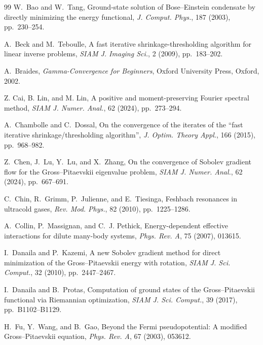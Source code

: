 \documentclass[11pt]{article}
\theoremstyle{plain}
\theoremstyle{definition}
\numberwithin{equation}{section}
\begin{document}
\begin{thebibliography}{99}
W.~Bao and W.~Tang,
\newblock Ground-state solution of Bose--Einstein condensate by
directly minimizing the energy functional,
\newblock \emph{J. Comput. Phys.}, 187 (2003), pp.~230--254.

A.~Beck and M.~Teboulle,
\newblock A fast iterative shrinkage-thresholding algorithm for linear inverse problems,
\newblock \emph{SIAM J. Imaging Sci.}, 2 (2009), pp.~183--202.

A.~Braides,
\newblock \emph{Gamma-Convergence for Beginners},
\newblock Oxford University Press, Oxford, 2002.


Z. Cai, B. Lin, and M. Lin,
\newblock A positive and moment-preserving {Fourier} spectral method,
\newblock \emph{SIAM J. Numer. Anal.}, 62 (2024), pp.~273--294.


A.~Chambolle and C.~Dossal,
\newblock On the convergence of the iterates of the ``fast iterative
shrinkage/thresholding algorithm'',
\newblock \emph{J. Optim. Theory Appl.}, 166 (2015), pp.~968--982.

Z.~Chen, J.~Lu, Y.~Lu, and X.~Zhang,
\newblock On the convergence of Sobolev gradient flow for the
Gross--Pitaevskii eigenvalue problem,
\newblock \emph{SIAM J. Numer. Anal.}, 62 (2024), pp.~667--691.

C.~Chin, R.~Grimm, P.~Julienne, and E.~Tiesinga,
\newblock Feshbach resonances in ultracold gases,
\newblock \emph{Rev. Mod. Phys.}, 82 (2010), pp.~1225--1286.

A.~Collin, P.~Massignan, and C.~J. Pethick,
\newblock Energy-dependent effective interactions for dilute
many-body systems,
\newblock \emph{Phys. Rev. A}, 75 (2007), 013615.

I.~Danaila and P.~Kazemi,
\newblock A new Sobolev gradient method for direct minimization of the
Gross--Pitaevskii energy with rotation,
\newblock \emph{SIAM J. Sci. Comput.}, 32 (2010), pp.~2447--2467.

I.~Danaila and B.~Protas,
\newblock Computation of ground states of the Gross--Pitaevskii
functional via Riemannian optimization,
\newblock \emph{SIAM J. Sci. Comput.}, 39 (2017), pp.~B1102--B1129.

H.~Fu, Y.~Wang, and B.~Gao,
\newblock Beyond the Fermi pseudopotential: A modified
Gross--Pitaevskii equation,
\newblock \emph{Phys. Rev. A}, 67 (2003), 053612.


\end{thebibliography}
\end{document}
